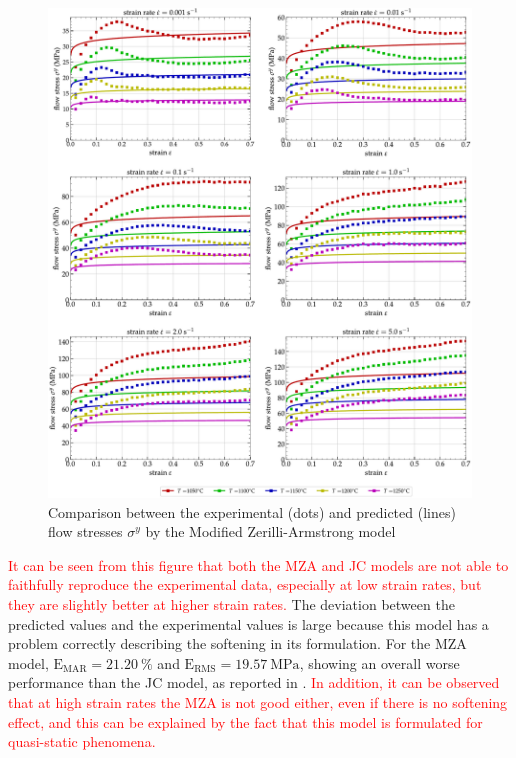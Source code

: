 \documentclass[metals,article,submit,pdftex,moreauthors]{Definitions/mdpi}
\DeclareRobustCommand{\RMSE}{\text{E}_\text{RMS}}
\DeclareRobustCommand{\MARE}{\text{E}_\text{MAR}}
\DeclareRobustCommand{\MPa}{\text{MPa}}
\begin{document}
\begin{figure}[!ht]
\centering
\includegraphics[width=\columnwidth]
{Figures/CompExp-MZA-6}
\caption{Comparison between the experimental (dots) and predicted (lines) flow stresses $\sigma^y$ by the Modified Zerilli-Armstrong model}
\label{fig:CompExp-MZA-6}
\end{figure}
\textcolor{red}{It can be seen from this figure that both the MZA and JC models are not able to faithfully reproduce the experimental data, especially at low strain rates, but they are slightly better at higher strain rates.}
The deviation between the predicted values and the experimental values is large because this model has a problem correctly describing the softening in its formulation.
For the MZA model, $\MARE=21.20~\%$ and $\RMSE=19.57~\MPa$, showing an overall worse performance than the JC model, as reported in \cite{TizeMha-2022}.
\textcolor{red}{In addition, it can be observed that at high strain rates the MZA is not good either, even if there is no softening effect, and this can be explained by the fact that this model is formulated for quasi-static phenomena.}
\end{document}

